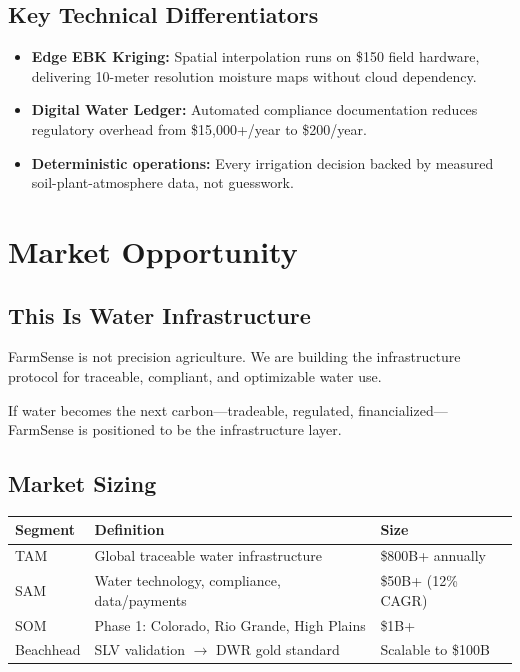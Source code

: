 \documentclass[10pt]{article}
\begin{document}
\subsection{Key Technical Differentiators}

\begin{itemize}
    \item \textbf{Edge EBK Kriging:} Spatial interpolation runs on \$150 field hardware, delivering 10-meter resolution moisture maps without cloud dependency.
    \item \textbf{Digital Water Ledger:} Automated compliance documentation reduces regulatory overhead from \$15,000+/year to \$200/year.
    \item \textbf{Deterministic operations:} Every irrigation decision backed by measured soil-plant-atmosphere data, not guesswork.
\end{itemize}

\newpage

\section{Market Opportunity}

\subsection{This Is Water Infrastructure}

FarmSense is not precision agriculture. We are building the infrastructure protocol for traceable, compliant, and optimizable water use.

If water becomes the next carbon—tradeable, regulated, financialized—FarmSense is positioned to be the infrastructure layer.

\subsection{Market Sizing}

\begin{table}[h]
\centering
\begin{tabular}{@{}lp{3in}l@{}}
\toprule
\textbf{Segment} & \textbf{Definition} & \textbf{Size} \\
\midrule
TAM & Global traceable water infrastructure & \$800B+ annually \\
SAM & Water technology, compliance, data/payments & \$50B+ (12\% CAGR) \\
SOM & Phase 1: Colorado, Rio Grande, High Plains & \$1B+ \\
Beachhead & SLV validation $\rightarrow$ DWR gold standard & Scalable to \$100B \\
\bottomrule
\end{tabular}
\end{table}
\end{document}
